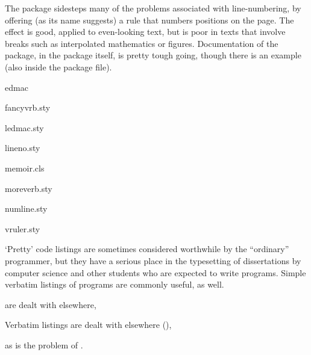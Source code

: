 The  package sidesteps many of the problems associated
with line-numbering, by offering (as its name suggests) a rule that
numbers positions on the page.  The effect is good, applied to
even-looking text, but is poor in texts that involve breaks such as
interpolated mathematics or figures.  Documentation of the package, in
the package itself, is pretty tough going, though there is an example
(also inside the package file).
\begin{ctanrefs}
\item[edmac]
\item[fancyvrb.sty]
\item[ledmac.sty]
\item[lineno.sty]
\item[memoir.cls]
\item[moreverb.sty]
\item[numline.sty]
\item[vruler.sty]
\end{ctanrefs}


`Pretty' code listings are sometimes considered worthwhile by the
``ordinary'' programmer, but they have a serious place in
the typesetting of dissertations by computer science and other
students who are expected to write programs.  Simple verbatim listings
of programs are commonly useful, as well.

\begin{hyperversion}
   are dealt with elsewhere,
\end{hyperversion}
\begin{flatversion}
  Verbatim listings are dealt with elsewhere (),
\end{flatversion}
as is the problem of %
.

